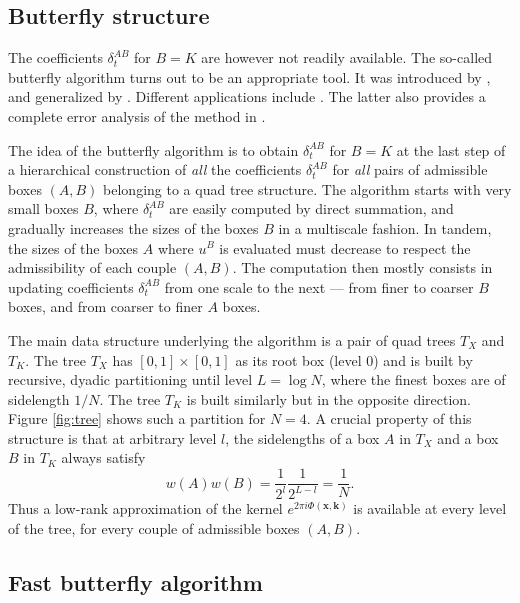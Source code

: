 

\subsection{Butterfly structure}

The coefficients $\delta_t^{AB}$ for $B=K$ are however not readily available. The so-called butterfly algorithm turns out to be an appropriate tool. It was introduced by \cite{MB96}, and generalized by \cite{OWR10, CDY09}. Different applications include \cite{Ying09, DFMPY12}. The latter also provides a complete error analysis of the method in \cite{CDY09}.

The idea of the butterfly algorithm is to obtain $\delta_t^{AB}$ for $B=K$ at the last step of a hierarchical construction of {\it all} the coefficients $\delta_t^{AB}$ for {\it all} pairs of admissible boxes $(A,B)$ belonging to a quad tree structure. The algorithm starts with very small boxes $B$, where $\delta_t^{AB}$ are easily computed by direct summation, and gradually increases the sizes of the boxes $B$ in a multiscale fashion. In tandem, the sizes of the boxes $A$ where $u^B$ is evaluated must decrease to respect the admissibility of each couple $(A,B)$. The computation then mostly consists in updating coefficients $\delta_t^{AB}$ from one scale to the next --- from finer to coarser $B$ boxes, and from coarser to finer $A$ boxes. 

The main data structure underlying the algorithm is a pair of quad trees $T_X$ and $T_K$. The tree $T_X$ has $[0,1]\times[0,1]$ as its root box (level $0$) and is built by recursive, dyadic partitioning until level $L=\log N$, where the finest boxes are of sidelength $1/N$. The tree $T_K$ is built similarly but in the opposite direction. Figure \ref{fig:tree} shows such a partition for $N=4$. A crucial property of this structure is that at arbitrary level $l$, the sidelengths of a box $A$ in $T_X$ and a box $B$ in $T_K$ always satisfy $$w(A)w(B)=\frac{1}{2^l}\frac{1}{2^{L-l}}=\frac{1}{N}.$$ Thus a low-rank approximation of the kernel $e^{2\pi i \Phi(\mathbf{x},\mathbf{k})}$ is available at every level of the tree, for every couple of admissible boxes $(A,B)$.




\subsection{Fast butterfly algorithm}

